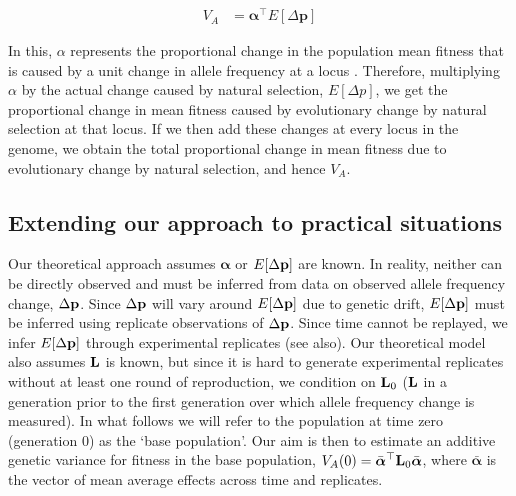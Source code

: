 \documentclass[12pt]{article}
\begin{document}
\begin{bibunit}
\begin{equation} \label{eq2b}
\begin{array}{rl}
{V_A} &= \boldsymbol{\alpha}^{\top}E[\Delta{\textbf{p}}]
\end{array}
\end{equation}

In this,  $\alpha$ represents the proportional change in the population mean fitness that is caused by a unit change in allele frequency at a locus \citep{Fisher.1941, Kojima.1959, Lee.2013}. Therefore, multiplying $\alpha$ by the actual change caused by natural selection, $E[\Delta p]$, we get the proportional change in mean fitness caused by evolutionary change by natural selection at that locus. If we then add these changes at every locus in the genome, we obtain the total proportional change in mean fitness due to evolutionary change by natural selection, and hence $V_A$.  



\subsection*{Extending our approach to practical situations}


Our theoretical approach assumes $\boldsymbol{\alpha}$ or $E[\Delta {\bf p}]$ are known. In reality, neither can be directly observed and must be inferred from data on observed allele frequency change, $\Delta {\bf p}$. Since $\Delta {\bf p}$ will vary around $E[\Delta {\bf p}]$ due to genetic drift, $E[\Delta {\bf p}]$ must be inferred using replicate observations of $\Delta {\bf p}$. Since time cannot be replayed, we infer $E[\Delta {\bf p}]$ through experimental replicates (see \citet{Buffalo.2020} also). Our theoretical model also assumes ${\bf L}$ is known, but since it is hard to generate experimental replicates without at least one round of reproduction, we condition on ${\bf L}_{0}$ (${\bf L}$ in a generation prior to the first generation over which allele frequency change is measured). In what follows we will refer to the population at time zero (generation 0) as the `base population'. Our aim is then to estimate an additive genetic variance for fitness in the base population, $V_A(0)=\bar{\boldsymbol{\alpha}}^{\top}{\bf L}_0\bar{\boldsymbol{\alpha}}$, where $\bar{\boldsymbol{\alpha}}$ is the vector of mean average effects across time and replicates. \\


\end{bibunit}
\end{document}
